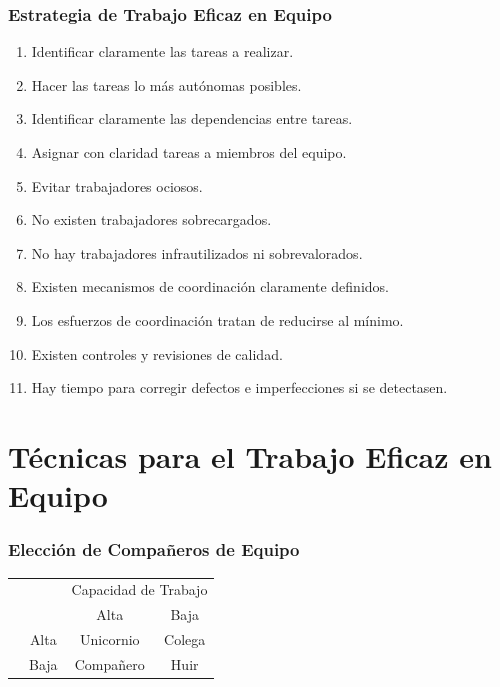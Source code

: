 \documentclass[handout,a4paper,t,xcolor=pst,dvips]{beamer}
\begin{document}
\begin{frame}[c]
	\frametitle{Estrategia de Trabajo Eficaz en Equipo}
	\begin{enumerate}[<+->]
		\item Identificar claramente las tareas a realizar.
		\item Hacer las tareas lo más autónomas posibles.
		\item Identificar claramente las dependencias entre tareas.
		\item Asignar con claridad tareas a miembros del equipo.
		\item Evitar trabajadores ociosos.
		\item No existen trabajadores sobrecargados.
		\item No hay trabajadores infrautilizados ni sobrevalorados.
		\item Existen mecanismos de coordinación claramente definidos.
		\item Los esfuerzos de coordinación tratan de reducirse al mínimo.
		\item Existen controles y revisiones de calidad.
		\item Hay tiempo para corregir defectos e imperfecciones si se detectasen.
	\end{enumerate}
\end{frame}

\section{Técnicas para el Trabajo Eficaz en Equipo}

\begin{frame}[c]
	\frametitle{Elección de Compañeros de Equipo}
	
	\renewcommand{\arraystretch}{2.0}
	
	\begin{center}
		\begin{tabular}{|l|p{2cm}|p{2cm}|p{2cm}|}
			\cline{3-4}
			\multicolumn{2}{l}{}  & \multicolumn{2}{|c|}{Capacidad de  Trabajo} \\ \cline{3-4}
			\multicolumn{2}{l|}{} & \multicolumn{1}{c|}{Alta}                 & 
			\multicolumn{1}{c|}{Baja}         \\ \cline{1-4}
			\multirow{2}{*}{\rotatebox[origin=c]{90}{Afinidad}} & 
			\multicolumn{1}{c|}{Alta} & \multicolumn{1}{c|}{Unicornio} & \multicolumn{1}{c|}{Colega} \\
			\cline{2-4}
			& \multicolumn{1}{c|}{Baja} & \multicolumn{1}{c|}{Compañero}  & \multicolumn{1}{c|}{Huir} \\
			\cline{1-4}
		\end{tabular}
	\end{center}
\end{frame}
\end{document}
